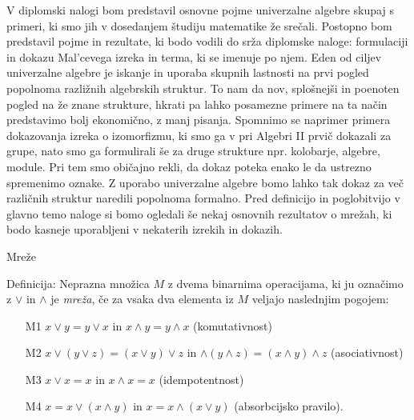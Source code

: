 V diplomski nalogi bom predstavil osnovne pojme univerzalne algebre skupaj s primeri, ki smo jih v dosedanjem študiju
matematike že srečali. Postopno bom predstavil pojme in rezultate, ki bodo vodili do srža diplomske naloge:
formulaciji in dokazu Mal'cevega izreka in terma, ki se imenuje po njem.
Eden od ciljev univerzalne algebre je iskanje in uporaba skupnih lastnosti na prvi pogled popolnoma
razližnih algebrskih struktur. To nam da nov, splošnejši in poenoten pogled na že znane strukture, hkrati pa lahko 
posamezne primere na ta način predstavimo bolj ekonomično, z manj pisanja. 
Spomnimo se naprimer primera dokazovanja izreka o izomorfizmu, ki smo ga v pri Algebri II prvič dokazali za grupe, nato 
smo ga formulirali še za druge strukture npr. kolobarje, algebre, module. Pri tem smo običajno rekli, da dokaz poteka 
enako le da ustrezno spremenimo oznake. Z uporabo univerzalne algebre bomo lahko tak dokaz za več različnih struktur 
naredili popolnoma formalno. 
Pred definicijo in poglobitvijo v glavno temo naloge si bomo ogledali še nekaj osnovnih rezultatov o mrežah, ki bodo 
kasneje uporabljeni v nekaterih izrekih in dokazih. 

Mreže 

Definicija: Neprazna množica $M$ z dvema binarnima operacijama, ki ju označimo z $\vee$ in $\wedge$ je \emph{mreža}, če 
za vsaka dva elementa iz $M$ veljajo naslednjim pogojem:\\
\begin{enumerate} 
    \item[M1] $x \vee y = y \vee x$ in $x \wedge y = y \wedge x$ (komutativnost)
    \item[M2] $x\vee \left(y \vee z\right) = \left(x \vee y\right)\vee z$ in 
    $\wedge \left(y \wedge z\right) = \left(x \wedge y\right)\wedge z$ (asociativnost)
    \item[M3] $x \vee x = x$ in $x \wedge x = x$ (idempotentnost)
    \item[M4] $x = x \vee \left(x \wedge y\right)$ in $x = x \wedge \left(x \vee y\right)$ (absorbcijsko pravilo).\\
\end{enumerate}

